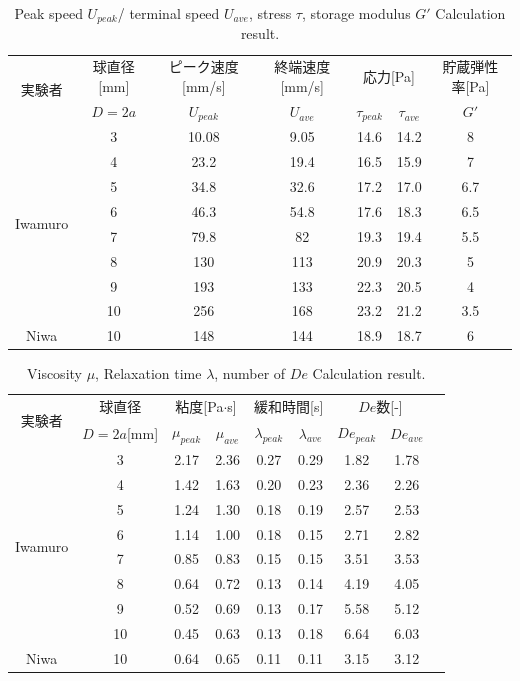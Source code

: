 \begin{table}[hbtp]
    \caption{Peak speed $U_{peak}$/ terminal speed $U_{ave}$, stress $\tau$, storage modulus $G'$ Calculation result.}
    \label{table:iwamuro}
    \centering
    \begin{tabular}{ccccccc}
      \hline
      \multirow{2}{*}{実験者} & 球直径[mm] & ピーク速度[mm/s] & 終端速度[mm/s] &\multicolumn{2}{c}{応力[Pa]} & 貯蔵弾性率[Pa] \\
       & $D=2a$ & $U_{peak}$ & $U_{ave}$ &  $\tau_{peak}$ & $\tau_{ave}$ & $G'$\\
      \hline \hline
      \multirow{8}{*}{Iwamuro} & 3  & 10.08 & 9.05 & 14.6 & 14.2 & 8\\
      & 4  & 23.2 & 19.4 & 16.5 & 15.9 & 7\\
      & 5  & 34.8 & 32.6 & 17.2 & 17.0 & 6.7 \\
      & 6  & 46.3 & 54.8 & 17.6 & 18.3 & 6.5\\
      & 7  & 79.8 & 82 & 19.3 & 19.4 & 5.5\\
      & 8  & 130 & 113 & 20.9 & 20.3 & 5 \\
      & 9  & 193 & 133 & 22.3 & 20.5 & 4\\
      & 10 & 256 & 168 & 23.2 & 21.2 & 3.5\\
      \hline \hline
      Niwa & 10 & 148 & 144 & 18.9 & 18.7 & 6 \\
      \hline
    \end{tabular}
\end{table}
\begin{table}[hbtp]
    \caption{Viscosity $\mu$, Relaxation time $\lambda$, number of $De$ Calculation result.}
    \label{table:iwamuro2}
    \centering
    \begin{tabular}{ccccccccc}
      \hline
      \multirow{2}{*}{実験者} & 球直径 &\multicolumn{2}{c}{粘度[Pa$\cdot$s]} &\multicolumn{2}{c}{緩和時間[s]}  &\multicolumn{2}{c}{$De$数[-]} \\
       & $D=2a$[mm] & $\mu_{peak}$ & $\mu_{ave}$  &  $\lambda_{peak}$ & $\lambda_{ave}$ & $De_{peak}$ & $De_{ave}$ \\
      \hline \hline
      \multirow{8}{*}{Iwamuro} & 3  & 2.17 & 2.36 & 0.27 & 0.29 & 1.82 & 1.78\\
      & 4  & 1.42 & 1.63 & 0.20 & 0.23 & 2.36 & 2.26\\
      & 5  & 1.24 & 1.30 & 0.18 & 0.19 & 2.57 & 2.53 \\
      & 6  & 1.14 & 1.00 & 0.18 & 0.15 & 2.71 & 2.82\\
      & 7  & 0.85 & 0.83 & 0.15 & 0.15 & 3.51 & 3.53\\
      & 8  & 0.64 & 0.72 & 0.13 & 0.14 & 4.19 & 4.05 \\
      & 9  & 0.52 & 0.69 & 0.13 & 0.17 & 5.58 & 5.12\\
      & 10 & 0.45 & 0.63 & 0.13 & 0.18 & 6.64 & 6.03\\
      \hline \hline
      Niwa & 10 & 0.64 & 0.65 & 0.11 & 0.11 & 3.15 & 3.12 \\
      \hline
    \end{tabular}
\end{table}

